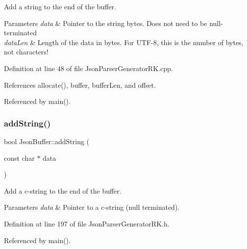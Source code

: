 Add a string to the end of the buffer. 


\begin{DoxyParams}{Parameters}
{\em data} & Pointer to the string bytes. Does not need to be null-\/terminated\\
\hline
{\em data\+Len} & Length of the data in bytes. For U\+T\+F-\/8, this is the number of bytes, not characters! \\
\hline
\end{DoxyParams}


Definition at line 48 of file Json\+Parser\+Generator\+R\+K.\+cpp.



References allocate(), buffer, buffer\+Len, and offset.



Referenced by main().

\mbox{\label{class_json_buffer_a61bf30ac6e1bd460f1e809d02a7d5ba4}} 
\subsubsection{\texorpdfstring{add\+String()}{addString()}}
{\footnotesize\ttfamily bool Json\+Buffer\+::add\+String (\begin{DoxyParamCaption}\item[{const char $\ast$}]{data }\end{DoxyParamCaption})\hspace{0.3cm}{\ttfamily [inline]}}



Add a c-\/string to the end of the buffer. 


\begin{DoxyParams}{Parameters}
{\em data} & Pointer to a c-\/string (null terminated). \\
\hline
\end{DoxyParams}


Definition at line 197 of file Json\+Parser\+Generator\+R\+K.\+h.



Referenced by main().

\mbox{\label{class_json_buffer_a1eb9d0cae3ef9a9ac56b8580bc70fe2e}} 
